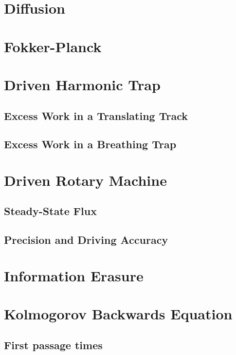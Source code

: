\documentclass[15pt]{article}
\begin{document}
\section{Diffusion}

\section{Fokker-Planck}


\section{Driven Harmonic Trap}

    \subsection{Excess Work in a Translating Track}

    \subsection{Excess Work in a Breathing Trap}


    \section{Driven Rotary Machine}

    \subsection{Steady-State Flux}

    \subsection{Precision and Driving Accuracy}

    \section{Information Erasure}

    \section{Kolmogorov Backwards Equation}

    \subsection{First passage times}
\end{document}
